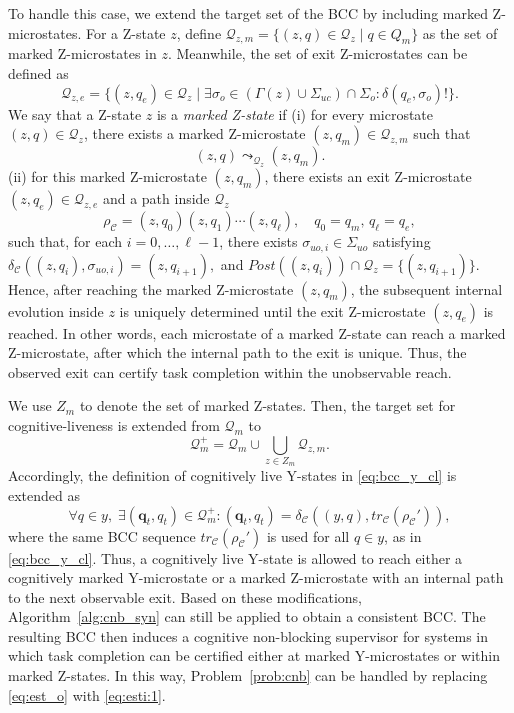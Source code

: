 \documentclass[journal,twoside,web]{ieeecolor}
\begin{document}
To handle this case, we extend the target set of the BCC by including marked Z-microstates. 
For a Z-state $z$, define
$
    \bm{\mathcal{Q}}_{z,m} = \{(z,q)\in \bm{\mathcal{Q}}_z \mid q\in Q_m\}
$
as the set of marked Z-microstates in $z$. 
Meanwhile, the set of exit Z-microstates can be defined as
$$
    \bm{\mathcal{Q}}_{z,e}
    =
    \{ (z, q_e) \in \bm{\mathcal{Q}}_z \mid
    \exists \sigma_o \in (\Gamma(z) \cup \Sigma_{uc}) \cap \Sigma_o : \delta(q_e,\sigma_o)! \}.
$$
%
We say that a Z-state $z$ is a \emph{marked Z-state} if (i) for every microstate $(z,q)\in \bm{\mathcal{Q}}_z$, there exists a marked Z-microstate $(z,q_m)\in \bm{\mathcal{Q}}_{z,m}$ such that
$$
    (z,q) \leadsto_{\bm{\mathcal{Q}}_z} (z,q_m).
$$
(ii) for this marked Z-microstate $(z, q_m)$, there exists an exit Z-microstate $(z, q_e)\in \bm{\mathcal{Q}}_{z,e}$ and a path inside $\bm{\mathcal{Q}}_z$
$$
    \rho_{\mathcal{C}}
    =
    (z,q_0)(z,q_1)\cdots(z,q_\ell),
    \quad
    q_0=q_m, \, q_\ell=q_e,
$$
such that, for each $i=0,\ldots,\ell-1$, there exists $\sigma_{uo,i} \in \Sigma_{uo}$ satisfying
$
    \delta_{\mathcal{C}}((z,q_i),\sigma_{uo,i}) = (z,q_{i+1}),
$
and
$
    Post((z,q_i))\cap \bm{\mathcal{Q}}_z = \{ (z, q_{i+1}) \}.
$
Hence, after reaching the marked Z-microstate $(z,q_m)$, the subsequent internal evolution inside $z$ is uniquely determined until the exit Z-microstate $(z,q_e)$ is reached.
%
In other words, each microstate of a marked Z-state can reach a marked Z-microstate, after which the internal path to the exit is unique. 
Thus, the observed exit can certify task completion within the unobservable reach.

We use $Z_m$ to denote the set of marked Z-states.
Then, the target set for cognitive-liveness is extended from
$\bm{\mathcal{Q}}_m$ to
\begin{equation}
    \bm{\mathcal{Q}}_m^{+}
    =
    \bm{\mathcal{Q}}_m \cup \bigcup_{z\in Z_m}\bm{\mathcal{Q}}_{z,m}.
    \label{eq:extended_target_set}
\end{equation}
Accordingly, the definition of cognitively live Y-states in
\eqref{eq:bcc_y_cl} is extended as
\begin{equation}
\label{eq:bcc_y_cl:2}
    \forall q \in y,\;
    \exists (\bm{q}_t,q_t)\in \bm{\mathcal{Q}}_m^{+} :
    (\bm{q}_t,q_t) = \delta_{\mathcal{C}}((y,q),tr_{\mathcal{C}}(\rho_{\mathcal{C}}')),
\end{equation}
where the same BCC sequence $tr_{\mathcal{C}}(\rho_{\mathcal{C}}')$ is used for all $q\in y$, as in \eqref{eq:bcc_y_cl}.
Thus, a cognitively live Y-state is allowed to reach either a cognitively marked Y-microstate or a marked Z-microstate with an internal path to the next observable exit.
%
Based on these modifications, Algorithm~\ref{alg:cnb_syn} can still be applied to obtain a consistent BCC. 
The resulting BCC then induces a cognitive non-blocking supervisor for systems in which task completion can be certified either at marked Y-microstates or within marked Z-states.
In this way, Problem~\ref{prob:cnb} can be handled by replacing \eqref{eq:est_o} with \eqref{eq:esti:1}.
\end{document}
